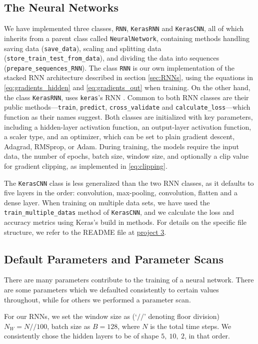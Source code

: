 \documentclass[%
reprint,
amsmath,amssymb,
aps,
]{revtex4-2}
\begin{document}
\subsection{The Neural Networks}
We have implemented three classes, \texttt{RNN}, \texttt{KerasRNN} and \texttt{KerasCNN}, all of which inherits from a parent class called \texttt{NeuralNetwork}, containing methods handling saving data (\texttt{save\_data}), 
scaling and splitting data (\texttt{store\_train\_test\_from\_data}), and dividing the data into sequences (\texttt{prepare\_sequences\_RNN}). The class \texttt{RNN} is our own implementation of the stacked RNN architecture described in section \ref{sec:RNNs}, using the equations in \eqref{eq:gradients_hidden} and \eqref{eq:gradients_out} when training. On the other hand, the class \texttt{KerasRNN}, uses \texttt{keras}'s RNN \cite{keras_recurrent_layers}. Common to both RNN classes are their public methods—\texttt{train}, \texttt{predict}, \texttt{cross\_validate} and \texttt{calculate\_loss}—which function as their names suggest. Both classes are initialized with key parameters, including a hidden-layer activation function, an output-layer activation function, a scaler type, and an optimizer, which can be set to plain gradient descent, Adagrad, RMSprop, or Adam. During training, the models require the input data, the number of epochs, batch size, window size, and optionally a clip value for gradient clipping, as implemented in \eqref{eq:clipping}. 

The \texttt{KerasCNN} class is less generalized than the two RNN classes, as it defaults to five layers in the order: convolution, max-pooling, convolution, flatten and  a dense layer. When training on multiple data sets, we have used the \texttt{train\_multiple\_datas} method of \texttt{KerasCNN}, and we calculate the loss and accuracy metrics using Keras's build in methods. For details on the specific file structure, we refer to the README file at \href{https://github.com/EdvardRornes/FYS-STK4155/tree/main/Project3}{project 3}.

\subsection{Default Parameters and Parameter Scans}
There are many parameters contribute to the training of a neural network. There are some parameters which we defaulted consistently to certain values throughout, while for others we performed a parameter scan. 

For our RNNs, we set the window size as (`\(//\)' denoting floor division) \(N_{W} = N//100\), batch size as \(B=128\), where \(N\) is the total time steps. We consistently chose the hidden layers to be of shape \(5, \ 10, \ 2\), in that order. 
\end{document}

